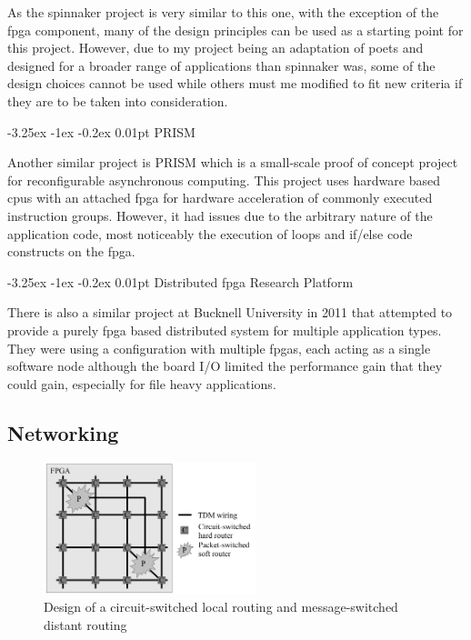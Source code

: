 \documentclass[paper=a4, fontsize=11pt, bibliography=totocnumbered]{scrartcl}
\makeatletter
\renewcommand\paragraph{\@startsection{paragraph}{4}{\z@}%
  {-3.25ex \@plus -1ex \@minus -0.2ex}%
  {0.01pt}%
  {\raggedsection\normalfont\sectfont\nobreak\size@paragraph}%
}
\numberwithin{equation}{section}		%
\numberwithin{figure}{section}			%
\numberwithin{table}{section}				%
\makeatother
\begin{document}
As the \gls{spinnaker} project is very similar to this one, with the exception of the \gls{fpga} component, many of the design principles can be used as a starting point for this project. However, due to my project being an adaptation of \gls{poets} and designed for a broader range of applications than \gls{spinnaker} was, some of the design choices cannot be used while others must me modified to fit new criteria if they are to be taken into consideration.

\paragraph{PRISM}

Another similar project is PRISM\cite{pub:agarwal1994asynchronous} which is a small-scale proof of concept project for reconfigurable asynchronous computing. This project uses hardware based \glspl{cpu} with an attached \gls{fpga} for hardware acceleration of commonly executed instruction groups. However, it had issues due to the arbitrary nature of the application code, most noticeably the execution of loops and if/else code constructs on the \gls{fpga}.

\paragraph{Distributed \gls{fpga} Research Platform}

There is also a similar project at Bucknell University in 2011\cite{pub:2_su_2011} that attempted to provide a purely \gls{fpga} based distributed system for multiple application types. They were using a configuration with multiple \glspl{fpga}, each acting as a single \gls{software node} although the board I/O limited the performance gain that they could gain, especially for file heavy applications.

\subsection{Networking}

\begin{figure}
\centering
\vspace{-2\normalbaselineskip}
\includegraphics[width=0.55\textwidth,keepaspectratio]{switching_ucam.png}
\caption{Design of a circuit-switched local routing and message-switched distant routing\cite{rpt:francis2013exploring}}
\label{fig:francis_network}
\vspace{-\normalbaselineskip}
\end{figure}
\end{document}
